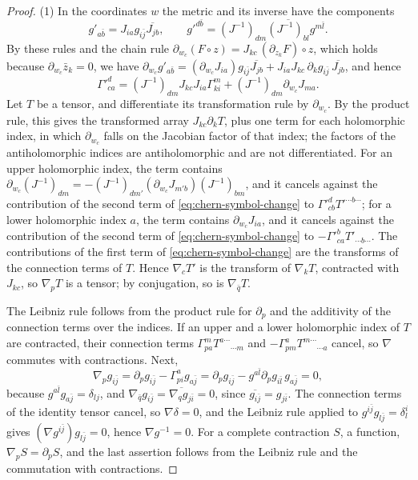 \begin{proof}
(1) In the coordinates $w$ the metric and its inverse have the components
\[
 g'_{a\bar b}=J_{ia}g_{i\bar j}\overline{J_{jb}},\qquad g'^{d\bar b}=(J^{-1})_{dm}\overline{(J^{-1})_{bl}}g^{m\bar l}.
\]
By these rules and the chain rule $\partial_{w_c}(F\circ z)=J_{kc}\,(\partial_{z_k}F)\circ z$, which holds because $\partial_{w_c}\bar z_k=0$, we have $\partial_{w_c}g'_{a\bar b}=(\partial_{w_c}J_{ia})g_{i\bar j}\overline{J_{jb}}+J_{ia}J_{kc}\,\partial_kg_{i\bar j}\,\overline{J_{jb}}$, and hence
\begin{equation}\label{eq:chern-symbol-change}
 \Gamma'^d_{ca}=(J^{-1})_{dm}J_{kc}J_{ia}\Gamma^m_{ki}+(J^{-1})_{dm}\partial_{w_c}J_{ma}.
\end{equation}
Let $T$ be a tensor, and differentiate its transformation rule by $\partial_{w_c}$. By the product rule, this gives the transformed array $J_{kc}\partial_kT$, plus one term for each holomorphic index, in which $\partial_{w_c}$ falls on the Jacobian factor of that index; the factors of the antiholomorphic indices are antiholomorphic and are not differentiated. For an upper holomorphic index, the term contains $\partial_{w_c}(J^{-1})_{dm}=-(J^{-1})_{dm'}(\partial_{w_c}J_{m'b})(J^{-1})_{bm}$, and it cancels against the contribution of the second term of \eqref{eq:chern-symbol-change} to $\Gamma'^d_{cb}T'^{\cdots b\cdots}$; for a lower holomorphic index $a$, the term contains $\partial_{w_c}J_{ia}$, and it cancels against the contribution of the second term of \eqref{eq:chern-symbol-change} to $-\Gamma'^b_{ca}T'_{\cdots b\cdots}$. The contributions of the first term of \eqref{eq:chern-symbol-change} are the transforms of the connection terms of $T$. Hence $\nabla_cT'$ is the transform of $\nabla_kT$, contracted with $J_{kc}$, so $\nabla_pT$ is a tensor; by conjugation, so is $\nabla_{\bar q}T$.

The Leibniz rule follows from the product rule for $\partial_p$ and the additivity of the connection terms over the indices. If an upper and a lower holomorphic index of $T$ are contracted, their connection terms $\Gamma^m_{pa}T^{a\cdots}{}_{\cdots m}$ and $-\Gamma^a_{pm}T^{m\cdots}{}_{\cdots a}$ cancel, so $\nabla$ commutes with contractions. Next,
\[
 \nabla_pg_{i\bar j}=\partial_pg_{i\bar j}-\Gamma^a_{pi}g_{a\bar j}=\partial_pg_{i\bar j}-g^{a\bar l}\partial_pg_{i\bar l}\,g_{a\bar j}=0,
\]
because $g^{a\bar l}g_{a\bar j}=\delta_{lj}$, and $\nabla_{\bar q}g_{i\bar j}=\overline{\nabla_qg_{j\bar i}}=0$, since $\overline{g_{i\bar j}}=g_{j\bar i}$. The connection terms of the identity tensor cancel, so $\nabla\delta=0$, and the Leibniz rule applied to $g^{i\bar j}g_{l\bar j}=\delta^i_l$ gives $(\nabla g^{i\bar j})g_{l\bar j}=0$, hence $\nabla g^{-1}=0$. For a complete contraction $S$, a function, $\nabla_pS=\partial_pS$, and the last assertion follows from the Leibniz rule and the commutation with contractions.


\end{proof}
